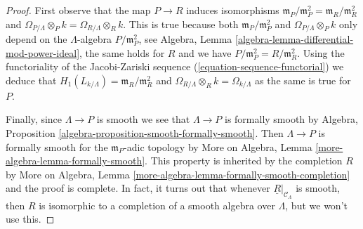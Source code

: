 \begin{proof}
\medskip\noindent
First observe that the map $P \to R$ induces isomorphisms
$\mathfrak m_P/\mathfrak m_P^2 = \mathfrak m_R/\mathfrak m_R^2$
and $\Omega_{P/\Lambda} \otimes_P k = \Omega_{R/\Lambda} \otimes_R k$.
This is true because both $\mathfrak m_P/\mathfrak m_P^2$
and $\Omega_{P/\Lambda} \otimes_P k$ only depend on the
$\Lambda$-algebra $P/\mathfrak m_P^2$, see
Algebra, Lemma \ref{algebra-lemma-differential-mod-power-ideal},
the same holds for $R$ and we have $P/\mathfrak m_P^2 = R/\mathfrak m_R^2$.
Using the functoriality of the Jacobi-Zariski sequence
(\ref{equation-sequence-functorial})
we deduce that $H_1(L_{k/\Lambda}) = \mathfrak m_R/\mathfrak m_R^2$ and
$\Omega_{R/\Lambda} \otimes_R k = \Omega_{k/\Lambda}$
as the same is true for $P$.

\medskip\noindent
Finally, since $\Lambda \to P$ is smooth we see that
$\Lambda \to P$ is formally smooth by
Algebra, Proposition \ref{algebra-proposition-smooth-formally-smooth}.
Then $\Lambda \to P$ is formally smooth for the $\mathfrak m_P$-adic
topology by More on Algebra, Lemma \ref{more-algebra-lemma-formally-smooth}.
This property is inherited by the completion $R$ by
More on Algebra, Lemma \ref{more-algebra-lemma-formally-smooth-completion}
and the proof is complete.
In fact, it turns out that whenever $\underline{R}|_{\mathcal{C}_\Lambda}$
is smooth, then $R$ is isomorphic to a completion of a smooth
algebra over $\Lambda$, but we won't use this.
\end{proof}